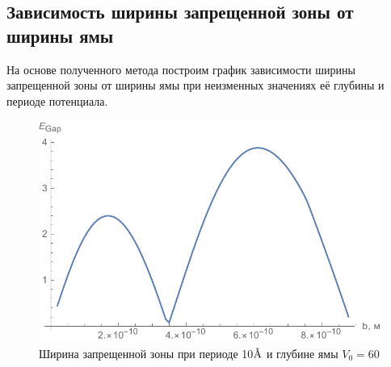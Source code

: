 \documentclass[a4paper, 12pt]{article}
\newcommand{\angstrom}{\textup{\AA}}
\begin{document}
    \subsection{Зависимость ширины запрещенной зоны от ширины ямы}
    На основе полученного метода построим график зависимости ширины запрещенной зоны от ширины ямы при неизменных значениях её глубины и периоде потенциала.
    \begin{figure}[!h]
        \centering
        \includegraphics{bandGap.pdf}
        \caption{Ширина запрещенной зоны при периоде 10$\angstrom$ и глубине ямы $V_0=60$}
    \end{figure}
\end{document}
